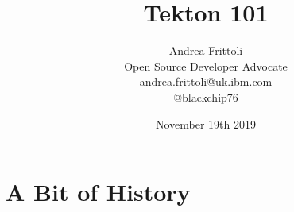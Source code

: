 \documentclass[aspectratio=169,11pt,hyperref={colorlinks=true}]{beamer}
\title{Tekton 101}
\date[kubeconna2019]{November 19th 2019}
\author[Andrea]{%
  Andrea Frittoli \\
  Open Source Developer Advocate \\
  andrea.frittoli@uk.ibm.com \\
  @blackchip76
}
\institute[kubeconna2019]{%
  KubeCon and CloudNativeCon North America 2019
}
\begin{document}
\begin{frame}[noframenumbering]
\titlepage{}
\end{frame}




\section{A Bit of History}
\end{document}
